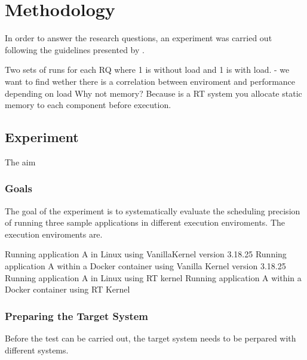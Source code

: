 \iffalse  \fi
\chapter{Methodology}

In order to answer the research questions, an experiment was carried out following the guidelines presented by \cite{Andreas}. 

Two sets of runs for each RQ where 1 is without load and 1 is with load. 
	- we want to find wether there is a correlation between enviroment and performance depending on load 
Why not memory? Because is a RT system you allocate static memory to each component before execution. 

\section{Experiment}
The aim 

\subsection{Goals}
The goal of the experiment is to systematically evaluate the scheduling precision of running three sample applications in different execution enviroments. The execution enviroments are. 

Running application A in Linux using VanillaKernel version 3.18.25
Running application A within a Docker container using Vanilla Kernel version 3.18.25
Running application A in Linux using RT kernel 
Running application A within a Docker container using RT Kernel 

\subsection{Preparing the Target System}
Before the test can be carried out, the target system needs to be perpared with different systems. 

